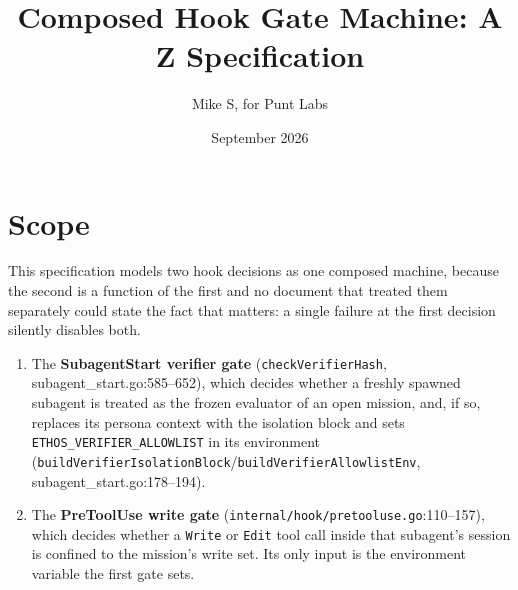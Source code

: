 \documentclass[a4paper,10pt,fleqn]{article}
\newcommand{\fpath}[1]{\texttt{#1}}
\newcommand{\field}[1]{\texttt{#1}}
\begin{document}
\title{Composed Hook Gate Machine: A Z Specification}
\author{Mike S, for Punt Labs}
\date{September 2026}
\maketitle
\tableofcontents
\newpage

\section{Scope}
\label{sec:scope}

This specification models two hook decisions as one composed
machine, because the second is a function of the first and no
document that treated them separately could state the fact that
matters: a single failure at the first decision silently disables
both.

\begin{enumerate}
  \item The \textbf{SubagentStart verifier gate}
    (\field{checkVerifierHash}, subagent\_start.go:585--652), which
    decides whether a freshly spawned subagent is treated as the
    frozen evaluator of an open mission, and, if so, replaces its
    persona context with the isolation block and sets
    \field{ETHOS\_VERIFIER\_ALLOWLIST} in its environment
    (\field{buildVerifierIsolationBlock}/\field{buildVerifierAllowlistEnv},
    subagent\_start.go:178--194).
  \item The \textbf{PreToolUse write gate}
    (\fpath{internal/hook/pretooluse.go}:110--157), which decides
    whether a \field{Write} or \field{Edit} tool call inside that
    subagent's session is confined to the mission's write set. Its
    only input is the environment variable the first gate sets.
\end{enumerate}
\end{document}
